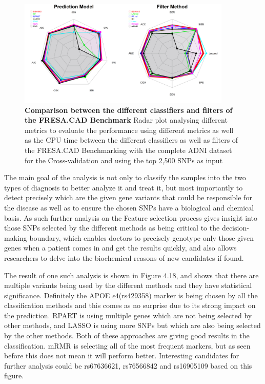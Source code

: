 \begin{figure}[!ht]
\centerline{\includegraphics[width=4in]{images/results/fresaRadar.png}}
\caption{{\bf Comparison between the different classifiers and filters of the FRESA.CAD Benchmark } 
Radar plot analysing different metrics to evaluate the performance using different metrics as well as the CPU time between the different classifiers as well as filters of the FRESA.CAD Benchmarking with the complete ADNI dataset for the Cross-validation and using the top 2,500 SNPs as input}
\label{fig19}
\end{figure}

The main goal of the analysis is not only to classify the samples into the two types of diagnosis to better analyze it and treat it, but most importantly to detect precisely which are the given gene variants that could be responsible for the disease as well as to ensure the chosen SNPs have a biological and chemical basis. As such further analysis on the Feature selection process gives insight into those SNPs selected by the different methods as being critical to the decision-making boundary, which enables doctors to precisely genotype only those given genes when a patient comes in and get the results quickly, and also allows researchers to delve into the biochemical reasons of new candidates if found.

The result of one such analysis is shown in Figure 4.18, and shows that there are multiple variants being used by the different methods and they have statistical significance. Definitely the APOE $\epsilon4$(rs429358) marker is being chosen by all the classification methods and this comes as no surprise due to its strong impact on the prediction. RPART is using multiple genes which are not being selected by other methods, and LASSO is using more SNPs but which are also being selected by the other methods. Both of these approaches are giving good results in the classification. mRMR is selecting all of the most frequent markers, but as seen before this does not mean it will perform better. Interesting candidates for further analysis could be rs67636621, rs76566842 and rs16905109 based on this figure.

